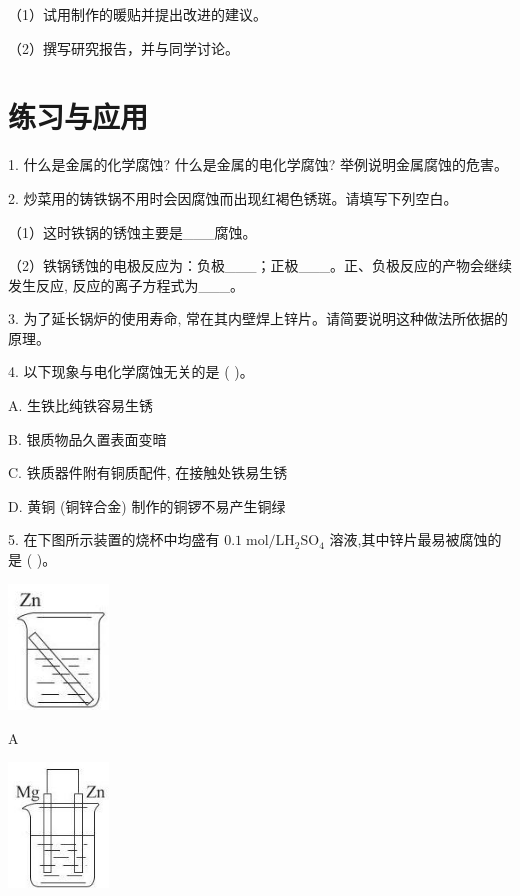 \documentclass[10pt]{article}
\begin{document}
（1）试用制作的暖贴并提出改进的建议。

（2）撰写研究报告，并与同学讨论。

\section*{练习与应用}

1. 什么是金属的化学腐蚀? 什么是金属的电化学腐蚀? 举例说明金属腐蚀的危害。

2. 炒菜用的铸铁锅不用时会因腐蚀而出现红褐色锈斑。请填写下列空白。

（1）这时铁锅的锈蚀主要是\_\_\_腐蚀。

（2）铁锅锈蚀的电极反应为：负极\_\_\_；正极\_\_\_。正、负极反应的产物会继续发生反应, 反应的离子方程式为\_\_\_。

3. 为了延长锅炉的使用寿命, 常在其内壁焊上锌片。请简要说明这种做法所依据的原理。

4. 以下现象与电化学腐蚀无关的是 ( )。

A. 生铁比纯铁容易生锈

B. 银质物品久置表面变暗

C. 铁质器件附有铜质配件, 在接触处铁易生锈

D. 黄铜 (铜锌合金) 制作的铜锣不易产生铜绿

5. 在下图所示装置的烧杯中均盛有 \({0.1}\mathrm{\;{mol}}/\mathrm{L}{\mathrm{H}}_{2}{\mathrm{{SO}}}_{4}\) 溶液,其中锌片最易被腐蚀的是 ( )。

\begin{center}
\includegraphics[max width=0.2\textwidth]{images/0190da9d-8bfd-732f-bc2c-0b21d0f13b91_122_131134.jpg}
\end{center}

A

\begin{center}
\includegraphics[max width=0.2\textwidth]{images/0190da9d-8bfd-732f-bc2c-0b21d0f13b91_122_975052.jpg}
\end{center}
\end{document}
